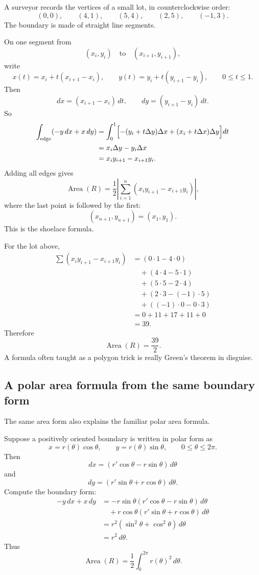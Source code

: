 \begin{example}
A surveyor records the vertices of a small lot, in counterclockwise order:
\[
    (0,0),\qquad
    (4,1),\qquad
    (5,4),\qquad
    (2,5),\qquad
    (-1,3).
\]
The boundary is made of straight line segments.

On one segment from
\[
    (x_i,y_i)
    \quad\text{to}\quad
    (x_{i+1},y_{i+1}),
\]
write
\[
    x(t)=x_i+t(x_{i+1}-x_i),
    \qquad
    y(t)=y_i+t(y_{i+1}-y_i),
    \qquad
    0\le t\le1.
\]
Then
\[
    dx=(x_{i+1}-x_i)\,dt,
    \qquad
    dy=(y_{i+1}-y_i)\,dt.
\]
So
\[
\begin{aligned}
\int_{\text{edge}}(-y\,dx+x\,dy)
&=
\int_0^1
\Bigl[
-(y_i+t\Delta y)\Delta x
+
(x_i+t\Delta x)\Delta y
\Bigr]dt\\
&=
x_i\Delta y-y_i\Delta x\\
&=
x_i y_{i+1}-x_{i+1}y_i.
\end{aligned}
\]
Adding all edges gives
\[
\boxed{
    \operatorname{Area}(R)
    =
    \frac12
    \left|
    \sum_{i=1}^n
    (x_i y_{i+1}-x_{i+1}y_i)
    \right|,
}
\]
where the last point is followed by the first:
\[
    (x_{n+1},y_{n+1})=(x_1,y_1).
\]
This is the shoelace formula.

For the lot above,
\[
\begin{aligned}
\sum (x_i y_{i+1}-x_{i+1}y_i)
&=
(0\cdot1-4\cdot0)\\
&\quad +(4\cdot4-5\cdot1)\\
&\quad +(5\cdot5-2\cdot4)\\
&\quad +(2\cdot3-(-1)\cdot5)\\
&\quad +((-1)\cdot0-0\cdot3)\\
&=
0+11+17+11+0\\
&=39.
\end{aligned}
\]
Therefore
\[
\boxed{
    \operatorname{Area}(R)=\frac{39}{2}.
}
\]
A formula often taught as a polygon trick is really Green's theorem in disguise.
\end{example}

\subsection{A polar area formula from the same boundary form}

The same area form also explains the familiar polar area formula.

Suppose a positively oriented boundary is written in polar form as
\[
    x=r(\theta)\cos\theta,
    \qquad
    y=r(\theta)\sin\theta,
    \qquad
    0\le \theta\le 2\pi.
\]
Then
\[
    dx=(r'\cos\theta-r\sin\theta)\,d\theta
\]
and
\[
    dy=(r'\sin\theta+r\cos\theta)\,d\theta.
\]
Compute the boundary form:
\[
\begin{aligned}
-y\,dx+x\,dy
&=
-r\sin\theta(r'\cos\theta-r\sin\theta)\,d\theta\\
&\quad
+r\cos\theta(r'\sin\theta+r\cos\theta)\,d\theta\\
&=
r^2(\sin^2\theta+\cos^2\theta)\,d\theta\\
&=
r^2\,d\theta.
\end{aligned}
\]
Thus
\[
\boxed{
    \operatorname{Area}(R)
    =
    \frac12\int_0^{2\pi}r(\theta)^2\,d\theta.
}
\]

